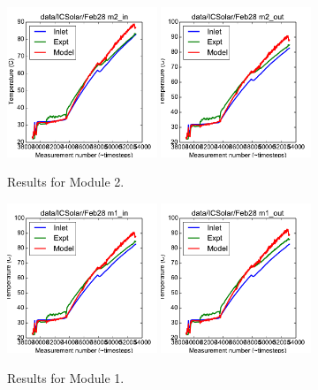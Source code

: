 \documentclass{article}
\begin{document}
\clearpage
\begin{figure}[!ht]
\centering
\includegraphics[width=0.4\textwidth]{../../data/ICSolar/images/Feb28_m2_in_unsteady.pdf}\hspace{0.05\textwidth}
\includegraphics[width=0.4\textwidth]{../../data/ICSolar/images/Feb28_m2_out_unsteady.pdf}\hspace{0.05\textwidth}\\
\caption{Results for Module 2.}\end{figure}
\begin{figure}[!ht]
\centering
\includegraphics[width=0.4\textwidth]{../../data/ICSolar/images/Feb28_m1_in_unsteady.pdf}\hspace{0.05\textwidth}
\includegraphics[width=0.4\textwidth]{../../data/ICSolar/images/Feb28_m1_out_unsteady.pdf}\hspace{0.05\textwidth}\\
\caption{Results for Module 1.}\end{figure}
\end{document}
